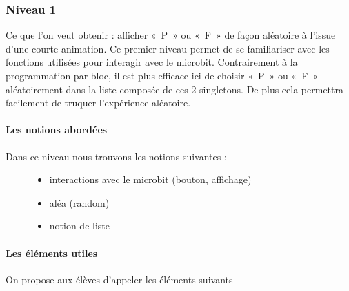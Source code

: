 \documentclass[letterpaper,10pt,french]{sphinxmanual}
\begin{document}
\subsubsection{Niveau 1}
\label{\detokenize{decouverte/pileface-python1:niveau-1}}\label{\detokenize{decouverte/pileface-python1::doc}}
Ce que l’on veut obtenir : afficher « P » ou « F » de façon aléatoire à l’issue d’une courte animation.
Ce premier niveau permet de se familiariser avec les fonctions utilisées pour interagir avec le microbit.
Contrairement à la programmation par bloc, il est plus efficace ici de choisir « P » ou « F »
aléatoirement dans la liste composée de ces 2 singletons.
De plus cela permettra facilement de truquer l’expérience aléatoire.


\paragraph{Les notions abordées}
\label{\detokenize{decouverte/pileface-python1:les-notions-abordees}}\begin{description}
\item[{Dans ce niveau nous trouvons les notions suivantes :}] \leavevmode\begin{itemize}
\item {} 
interactions avec le microbit (bouton, affichage)

\item {} 
aléa (random)

\item {} 
notion de liste

\end{itemize}

\end{description}


\paragraph{Les éléments utiles}
\label{\detokenize{decouverte/pileface-python1:les-elements-utiles}}
On propose aux élèves d’appeler les éléments suivants

%
\begin{sphinxVerbatim}[commandchars=\\\{\}]
  
 
    
\PYG{p}{[} \PYG{p}{]}    
\end{sphinxVerbatim}
\end{document}

